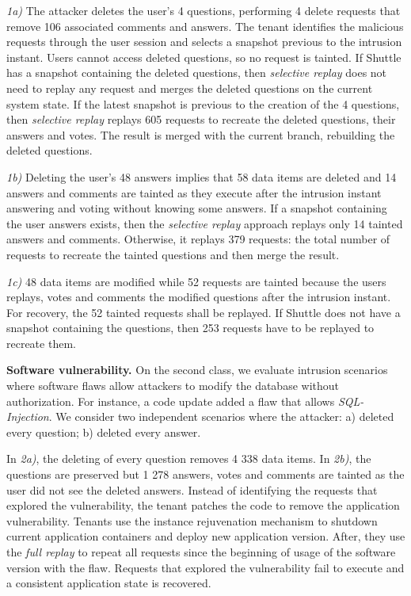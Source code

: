 \textit{1a)} The attacker deletes the user's 4 questions, performing 4 delete requests that remove 106 associated comments and answers. The tenant identifies the malicious requests through the user session and selects a snapshot previous to the intrusion instant. Users cannot access deleted questions, so no request is tainted. If Shuttle has a snapshot containing the deleted questions, then \textit{selective replay} does not need to replay any request and merges the deleted questions on the current system state. If the latest snapshot is previous to the creation of the 4 questions, then \textit{selective replay} replays 605 requests to recreate the deleted questions, their answers and votes. The result is merged with the current branch, rebuilding the deleted questions. 

\textit{1b)} Deleting the user's 48 answers implies that 58 data items are deleted and 14 answers and comments are tainted as they execute after the intrusion instant answering and voting without knowing some answers. If a snapshot containing the user answers exists, then the \textit{selective replay} approach replays only 14 tainted answers and comments. Otherwise, it replays 379 requests: the total number of requests to recreate the tainted questions and then merge the result.


\textit{1c)} 48 data items are modified while 52 requests are tainted because the users replays, votes and comments the modified questions after the intrusion instant. For recovery, the 52 tainted requests shall be replayed. If Shuttle does not have a snapshot containing the questions, then 253 requests have to be replayed to recreate them. 

\textbf{Software vulnerability.}
On the second class, we evaluate intrusion scenarios where software flaws allow attackers to modify the database without authorization. For instance, a code update added a flaw that allows \emph{SQL-Injection}. We consider two independent scenarios where the attacker: a) deleted every question; b) deleted every answer.

In \textit{2a)}, the deleting of every question removes 4 338 data items. In \textit{2b)}, the questions are preserved but 1 278 answers, votes and comments are tainted as the user did not see the deleted answers.
%
Instead of identifying the requests that explored the vulnerability, the tenant patches the code to remove the application vulnerability. Tenants use the instance rejuvenation mechanism to shutdown current application containers and deploy new application version. After, they use the \textit{full replay} to repeat all requests since the beginning of usage of the software version with the flaw. Requests that explored the vulnerability fail to execute and a consistent application state is recovered.\\




